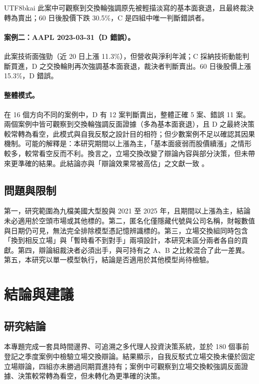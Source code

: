 \documentclass[12pt,a4paper]{article}
\newcommand{\grp}[1]{\textsf{#1}}
\begin{document}
\begin{CJK}{UTF8}{bkai}
此案中可觀察到交換輪強調原先被輕描淡寫的基本面衰退，且最終裁決轉為賣出；60 日後股價下跌 30.5\%，\grp{C} 是四組中唯一判斷錯誤者。

\paragraph{案例二：AAPL 2023-03-31（\grp{D} 錯誤）。} 此案技術面強勁（近 20 日上漲 11.3\%），但營收與淨利年減；\grp{C} 採納技術動能判斷買進，\grp{D} 之交換輪則再次強調基本面衰退，裁決者判斷賣出。60 日後股價上漲 15.3\%，\grp{D} 錯誤。

\paragraph{整體模式。} 在 16 個方向不同的案例中，\grp{D} 有 12 案判斷賣出，整體正確 5 案、錯誤 11 案。兩個案例中皆可觀察到交換輪強調反面證據（多為基本面衰退），且 \grp{D} 之最終決策較常轉為看空，此模式與自我反駁之設計目的相符；但少數案例不足以確認其因果機制。可能的解釋是：本研究期間以上漲為主，「基本面疲弱而股價續漲」之情形較多，較常看空反而不利。換言之，立場交換改變了辯論內容與部分決策，但未帶來更準確的結果。此結論亦與「辯論效果常被高估」之文獻一致 \citep{smit2023mad,zhang2025stop}。

\subsection{問題與限制}

第一，研究範圍為九檔美國大型股與 2021 至 2025 年，且期間以上漲為主，結論未必適用於空頭市場或其他標的。第二，匿名化僅隱藏代號與公司名稱，財報數值與日期仍可見，無法完全排除模型憑記憶辨識標的。第三，立場交換組同時包含「換到相反立場」與「暫時看不到對手」兩項設計，本研究未區分兩者各自的貢獻。第四，辯論組裁決者必須出手，與可持有之 \grp{A}、\grp{B} 之比較混合了此一差異。第五，本研究以單一模型執行，結論是否適用於其他模型尚待檢驗。

\section{結論與建議}

\subsection{研究結論}

本專題完成一套具時間邊界、可追溯之多代理人投資決策系統，並於 180 個事前登記之季度案例中檢驗立場交換辯論。結果顯示，自我反駁式立場交換未優於固定立場辯論，四組亦未勝過同期買進持有；案例中可觀察到立場交換較強調反面證據、決策較常轉為看空，但未轉化為更準確的決策。


\end{CJK}
\end{document}
